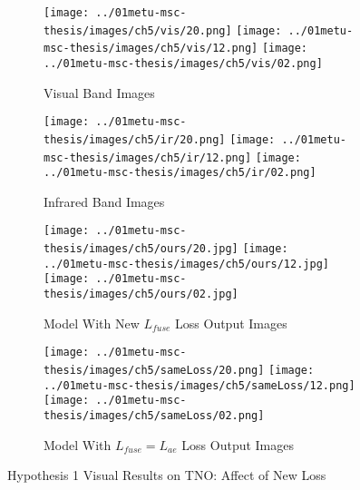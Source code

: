 \begin{figure}[htbp]
    \centering
    \begin{subfigure}[b]{\textwidth}
        \texttt{[image: ../01metu-msc-thesis/images/ch5/vis/20.png]}
        \texttt{[image: ../01metu-msc-thesis/images/ch5/vis/12.png]}
        \texttt{[image: ../01metu-msc-thesis/images/ch5/vis/02.png]}
        \caption{Visual Band Images}
        \label{fig:ch5:met2:vis}
    \end{subfigure}
    \vspace{0.01cm}
    \begin{subfigure}[b]{\textwidth}
        \texttt{[image: ../01metu-msc-thesis/images/ch5/ir/20.png]}
        \texttt{[image: ../01metu-msc-thesis/images/ch5/ir/12.png]}
        \texttt{[image: ../01metu-msc-thesis/images/ch5/ir/02.png]}
        \caption{Infrared Band Images}
        \label{fig:ch5:met2:ir}
    \end{subfigure}
    \vspace{0.01cm}
    \begin{subfigure}[b]{\textwidth}
        \texttt{[image: ../01metu-msc-thesis/images/ch5/ours/20.jpg]}
        \texttt{[image: ../01metu-msc-thesis/images/ch5/ours/12.jpg]}
        \texttt{[image: ../01metu-msc-thesis/images/ch5/ours/02.jpg]}
        \caption{Model With New $L_{fuse}$ Loss Output Images}
        \label{fig:ch5:met2:ours}
    \end{subfigure}
    \vspace{0.01cm}
    \begin{subfigure}[b]{\textwidth}
        \texttt{[image: ../01metu-msc-thesis/images/ch5/sameLoss/20.png]}
        \texttt{[image: ../01metu-msc-thesis/images/ch5/sameLoss/12.png]}
        \texttt{[image: ../01metu-msc-thesis/images/ch5/sameLoss/02.png]}
        \caption{Model With $ L_{fuse} = L_{ae}$ Loss Output Images}
        \label{fig:ch5:met2:sameLoss}
    \end{subfigure}
    \caption{Hypothesis 1 Visual Results on TNO: Affect of New Loss}
    \label{fig:ch5:met2}
\end{figure}

